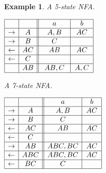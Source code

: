 \documentclass[preprint,12pt]{elsarticle}
\newtheorem{example}{Example}
\begin{document}
\begin{example}
\begin{table}[t]
\begin{minipage}[b]{0.45\linewidth}
\caption{A 5-state NFA.}
\label{tab:b3}
{\footnotesize
\begin{center}
$
\begin{array}{|c| c||c| c| }    
\hline
& \ \  \ \ 
&\ \ a \ \ &\ \ b \ \ \\
\hline  
\rightarrow & A
& \ A,B \ & \ AC \ \\
\hline  
\rightarrow& \ B \
& C & \\
\hline  
\leftarrow & AC
 &  AB &  AC  \\
\hline  
\leftarrow& \ C \
&  & \\
 \hline  
 & AB
 & \ AB,C \ &  A,C  \\
\hline  
\end{array}
$
\end{center}}
\end{minipage}
\hspace{.4cm}
\begin{minipage}[b]{0.45\linewidth}
\caption{A 7-state NFA.}
\label{tab:b4}
{\footnotesize
\begin{center}
$
\begin{array}{|c| c||c| c| c|c|}    
\hline
& \ \  \ \ 
&\ \ a \ \ &\ \ b \ \   \\
\hline  
\rightarrow & \ A \
&  \ A,B \  &  AC     \\
\hline  
\rightarrow& B
&  C &  \\
\hline  
\leftarrow& AC
&  \  AB \  &  AC \\
\hline  
\leftarrow& C
&    &   \\
\hline  
\rightarrow& AB
&   ABC, BC  &  AC \\
\hline  
\leftarrow& ABC
&    ABC,BC   &  AC \\
\hline  
\leftarrow& BC
&  \  C \  &   \\
\hline  
\end{array}
$
\end{center}}
\end{minipage}
\end{table}


\end{example}
\end{document}
